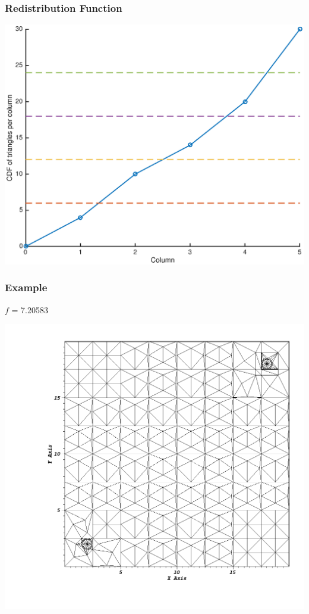 \documentclass[]{beamer}
\begin{document}
\begin{frame}[t]\frametitle{Redistribution Function}
\centering
\includegraphics[scale = 0.5]{figures/after_redistribute.eps}
\end{frame}

\begin{frame}[t]\frametitle{Example}
\begin{minipage}{0.15\textwidth}
\begin{footnotesize}
$f$ = 7.20583
\end{footnotesize}
\end{minipage}
\begin{minipage}{0.8\textwidth}
\centering
\includegraphics[scale = 0.22]{figures/redistribute_before.png}
\end{minipage}
\end{frame}
\end{document}

